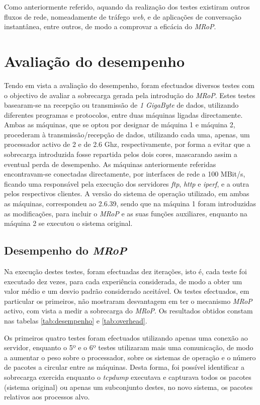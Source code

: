 Como anteriormente referido, aquando da realização dos testes existiram outros fluxos de rede, nomeadamente de tráfego \textit{web}, e de aplicações de conversação instantânea, entre outros, de modo a comprovar a eficácia do \textit{MRoP}.

\section{Avaliação do desempenho}
\label{sec:eval_performance}

Tendo em vista a avaliação do desempenho, foram efectuados diversos testes com o objectivo de avaliar a sobrecarga gerada pela introdução do \textit{MRoP}.
Estes testes basearam-se na recepção ou transmissão de \textit{1 GigaByte} de dados, utilizando diferentes programas e protocolos, entre duas máquinas ligadas directamente.
Ambas as máquinas, que se optou por designar de máquina 1 e máquina 2, procederam à transmissão/recepção de dados, utilizando cada uma, apenas, um processador activo de 2 e de 2.6 Ghz, respectivamente, por forma a evitar que a sobrecarga introduzida fosse repartida pelos dois cores, mascarando assim a eventual perda de desempenho.
As máquinas anteriormente referidas encontravam-se conectadas directamente, por interfaces de rede a 100 MBit/s, ficando uma responsável pela execução dos servidores \textit{ftp}, \textit{http} e \textit{iperf}, e a outra pelos respectivos clientes.
A versão do sistema de operação utilizado, em ambas as máquinas, correspondeu ao 2.6.39, sendo que na máquina 1 foram introduzidas as modificações, para incluir o \textit{MRoP} e as suas funções auxiliares, enquanto na máquina 2 se executou o sistema original.

\subsection{Desempenho do \textit{MRoP}}

Na execução destes testes, foram efectuadas dez iterações, isto é, cada teste foi executado dez vezes, para cada experiência considerada, de modo a obter um valor médio e um desvio padrão considerado aceitável.
Os testes efectuados, em particular os primeiros, não mostraram desvantagem em ter o mecanismo \textit{MRoP} activo, com vista a medir a sobrecarga do \textit{MRoP}.
Os resultados obtidos constam nas tabelas \ref{tab:desempenho} e \ref{tab:overhead}.

Os primeiros quatro testes foram efectuados utilizando apenas uma conexão ao servidor, enquanto o 5º e o 6º testes utilizaram mais uma comunicação, de modo a aumentar o peso sobre o processador, sobre os sistemas de operação e o número de pacotes a circular entre as máquinas.
Desta forma, foi possível identificar a sobrecarga exercida enquanto o \textit{tcpdump} executava e capturava todos os pacotes (sistema original) ou apenas um subconjunto destes, no novo sistema, os pacotes relativos aos processos alvo.

